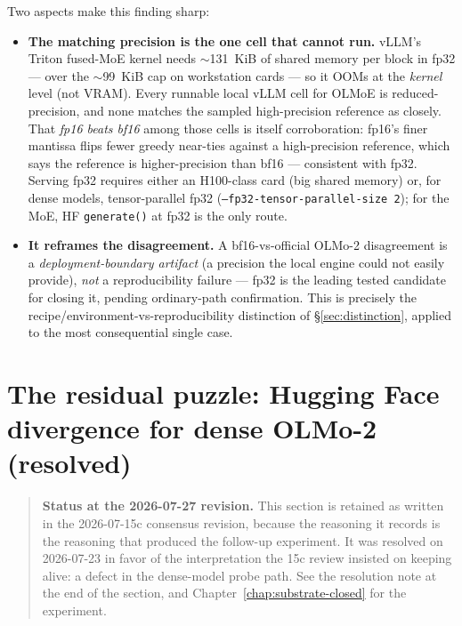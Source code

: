 \documentclass[11pt]{report}
\newcommand{\code}[1]{\texttt{#1}}
\newcommand{\evidencebox}[2]{\begin{quote}\noindent\textbf{#1.} #2\end{quote}}
\begin{document}
\par\medskip
Two aspects make this finding sharp:

\begin{itemize}[nosep]
  \item \textbf{The matching precision is the one cell that cannot run.} vLLM's
        Triton fused-MoE kernel needs $\sim$131~KiB of shared memory per block in
        fp32 --- over the $\sim$99~KiB cap on workstation cards --- so it OOMs at
        the \emph{kernel} level (not VRAM). Every runnable local vLLM cell for
        OLMoE is reduced-precision, and none matches the sampled high-precision reference as closely. That
        \emph{fp16 beats bf16} among those cells is itself corroboration: fp16's
        finer mantissa flips fewer greedy near-ties against a high-precision
        reference, which says the reference is higher-precision than bf16 ---
        consistent with fp32. Serving fp32 requires either an H100-class card (big
        shared memory) or, for dense models, tensor-parallel fp32
        (\code{--fp32-tensor-parallel-size 2}); for the MoE, HF \code{generate()}
        at fp32 is the only route.
  \item \textbf{It reframes the disagreement.} A bf16-vs-official OLMo-2
        disagreement is a \emph{deployment-boundary artifact} (a precision the
        local engine could not easily provide), \emph{not} a reproducibility
        failure --- fp32 is the leading tested candidate for closing it, pending ordinary-path confirmation. This is precisely the
        recipe/environment-vs-reproducibility distinction of \S\ref{sec:distinction},
        applied to the most consequential single case.
\end{itemize}

\section{The residual puzzle: Hugging Face divergence for dense OLMo-2 (resolved)}
\label{sec:residual-resolved}

\evidencebox{Status at the 2026-07-27 revision}{This section is retained as written
in the 2026-07-15c consensus revision, because the reasoning it records is the
reasoning that produced the follow-up experiment. It was resolved on 2026-07-23 in
favor of the interpretation the 15c review insisted on keeping alive: a defect in
the dense-model probe path. See the resolution note at the end of the section, and
Chapter~\ref{chap:substrate-closed} for the experiment.}
\end{document}
